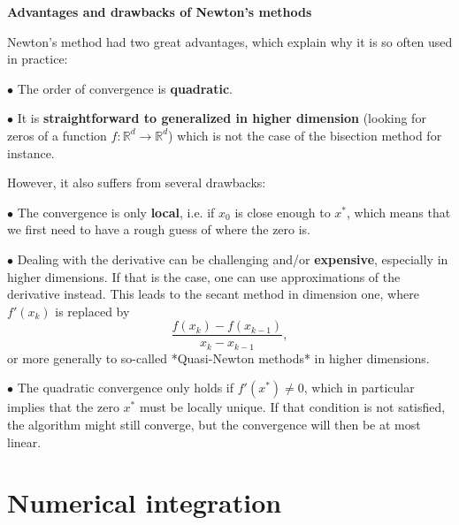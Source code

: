 \documentclass{article}
\begin{document}
        \begin{remark}
            \textbf{Advantages and drawbacks of Newton's methods}
            \vspace{6pt}

            Newton's method had two great advantages, which explain why it is so often used in practice:
            \vspace{10pt}
            
            $\bullet$ The order of convergence is \textbf{quadratic}.
            \vspace{4pt}
            
            $\bullet$ It is \textbf{straightforward to generalized in higher dimension} (looking for zeros of a function $f:\mathbb{R}^d\to\mathbb{R}^d$) which is not the case of the bisection method for instance.
            \vspace{12pt}
            
            However, it also suffers from several drawbacks:
            \vspace{10pt}
            
            $\bullet$ The convergence is only \textbf{local}, i.e. if $x_0$ is close enough to $x^*$, which means that we first need to have a rough guess of where the zero is.
            \vspace{4pt}
            
            $\bullet$ Dealing with the derivative can be challenging and/or \textbf{expensive}, especially in higher dimensions. If that is the case, one can use approximations of the derivative instead. This leads to the secant method in dimension one, where $f'(x_k)$ is replaced by
            $$
            \frac{f(x_k)-f(x_{k-1})}{x_k-x_{k-1}},
            $$
            or more generally to so-called *Quasi-Newton methods* in higher dimensions.
            \vspace{4pt}
            
            $\bullet$ The quadratic convergence only holds if $f'(x^*)\neq 0$, which in particular implies that the zero $x^*$ must be locally unique. If that condition is not satisfied, the algorithm might still converge, but the convergence will then be at most linear.
        \end{remark}

    \newpage

    \section{Numerical integration}
\end{document}
